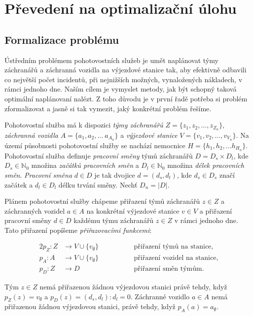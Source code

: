 \chapter{Převedení na optimalizační úlohu}

\section{Formalizace problému}\label{kap:formalizaceProblemu}

Ústředním problémem pohotovostních služeb je umět naplánovat týmy záchranářů a záchranná vozidla na výjezdové stanice tak, aby efektivně odbavili co největší počet incidentů,
při nejnižších možných, vynaložených nákladech, v rámci jednoho dne.
Naším cílem je vymyslet metody, jak být schopný taková optimální naplánovaní nalézt.
Z toho důvodu je v první řadě potřeba si problém zformalizovat a jasně si tak vymezit, jaký konkrétní problém řešíme.

Pohotovostní služba má k dispozici \textit{týmy záchranářů} $Z = \{ z_1, z_2, \dots, z_{Z_n} \}$, \textit{záchranná vozidla} $A = \{ a_1, a_2, \dots\ a_{A_n} \}$
a \textit{výjezdové stanice} $V = \{ v_1, v_2, \dots, v_{V_n} \}$. 
Na území působnosti pohotovostní služby se nachází nemocnice $H = \{ h_1, h_2, \dots h_{H_n} \}$.
Pohotovostní služba definuje \textit{pracovní směny} týmů záchranářů $D = D_{s} \times D_{l}$, 
kde $D_{s} \in \mathbb{N}_0$ množina \textit{začátků pracovních směn} a $D_{l} \in \mathbb{N}_0$ množina \textit{délek pracovních směn}.
\textit{Pracovní směna} $d \in D$ je tak dvojice $d = (d_s, d_l)$, kde $d_{s} \in D_{s}$ značí začátek a $d_{l} \in D_{l}$ délku trvání směny.
Nechť $D_n = |D|$.

Plánem pohotovostní služby chápeme přiřazení týmů záchranářů $z \in Z$ a záchranných vozidel $a \in A$ na konkrétní výjezdové stanice $v \in V$
a přiřazení pracovní směny $d \in D$ každému týmu záchranářů $z \in Z$ v rámci jednoho dne.
Tato přiřazení popíšeme \textit{přiřazovacími funkcemi}:
\begin{definice}
  \begin{alignat*}{2}
    p_Z \colon Z &\rightarrow V \cup \{ v_{\emptyset} \} \quad && \hspace{30pt} \text{přiřazení týmů na stanice}, \\
    p_A \colon A &\rightarrow V \cup \{ v_{\emptyset} \} \quad && \hspace{30pt} \text{přiřazení vozidel na stanice}, \\ 
    p_{D} \colon Z &\rightarrow D                        \quad && \hspace{30pt} \text{přiřazení směn týmům}.
  \end{alignat*}
\end{definice}
Tým $z \in Z$ nemá přiřazenou žádnou výjezdovou stanici právě tehdy, když
$p_{Z}(z) = v_{\emptyset}$ a $p_{D}(z) = (d_s, d_l) \colon d_l = 0$.
Záchranné vozidlo $a \in A$ nemá přiřazenou žádnou výjezdovou stanici, právě tehdy, když $p_{A}(a) = a_{\emptyset}$.

